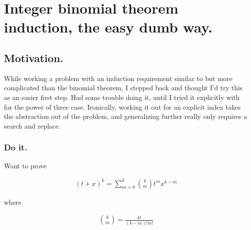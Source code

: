 
%
%




\chapter{Integer binomial theorem induction, the easy dumb way. }
\date{ March 26, 2009.  Last Revision: $Date: 2009/06/04 12:52:02 $ }

%


\section{Motivation. }

While working a problem with an induction requirement similar to but more 
complicated than the binomial theorem, I stepped back and thought I'd try
this as an easier first step.  Had some trouble doing it, until I tried it
explicitly with for the power of three case.  Ironically, working it
out for an explicit index takes the abstraction out of the problem, and
generalizing further really only requires a search and replace.

\subsection{Do it. }

Want to prove

\begin{align}
(t + x)^k = \sum_{m=0}^k \binom{k}{m} t^m x^{k-m}
\end{align}

where

\begin{align}
\binom{k}{m} = \frac{k!}{(k-m)!m!}
\end{align}

